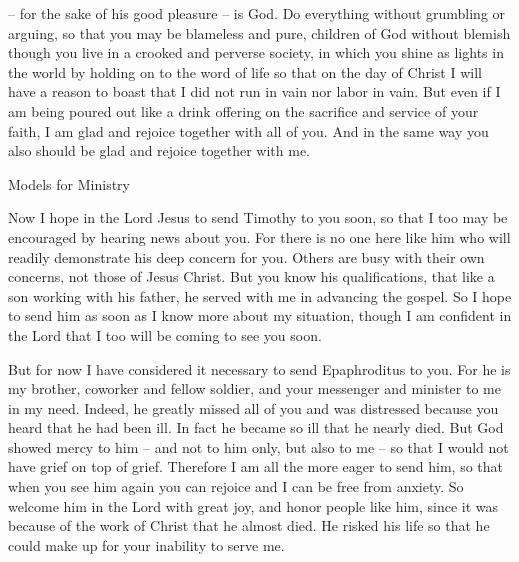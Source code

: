{– for the sake of
his good pleasure
– is
God.
Do
everything
without
grumbling
or
arguing,
so that
you may be
blameless
and
pure,
children
of God
without blemish
though you live in
a crooked
and
perverse
society,
in
which
you shine
as
lights
in
the world
by holding on to
the word
of life
so that
on
the day
of Christ
I
will have a reason to boast
that
I did
not
run
in
vain
nor
labor
in
vain.
But
even if
I am being poured out like a drink offering
on
the sacrifice
and
service
of your
faith,
I am glad
and
rejoice together
with all
of you.
And
in the same way
you
also
should be glad
and
rejoice together
with me.
\par }{\SH Models for Ministry
\par }{\PP {}Now I hope
in
the Lord
Jesus
to send
Timothy
to you
soon,
so that
I too
may be encouraged
by hearing news
about
you.
For
there is no one
here like
him who
will readily
demonstrate
his deep concern
for
you.
Others
are busy with their own
concerns,
not
those of Jesus
Christ.
But
you know
his
qualifications,
that
like
a son
working with his father,
he served
with
me
in advancing
the gospel.
So
I hope
to send
him as soon as
I know
more about
my situation,
though
I am confident
in
the Lord
that
I
too
will be coming
to see you soon.
\par }{\PP {}But
for now I have considered
it necessary
to send
Epaphroditus
to
you.
For he is my brother,
coworker
and
fellow soldier,
and your
messenger
and
minister
to me
in my
need.
Indeed,
he
greatly missed
all
of you
and
was distressed
because
you heard
that
he had been ill.
In fact he became so ill
that he nearly
died.
But
God
showed mercy
to him
– and
not
to him
only,
but
also
to me
– so that
I would
not
have
grief
on
top of grief.
Therefore
I am all the more eager
to send
him,
so that
when
you see
him
again
you can rejoice
and I
can be
free from anxiety.
So
welcome
him
in
the Lord
with
great
joy,
and
honor
people like him,
since
it was because
of the work
of Christ
that he almost
died.
He risked
his life
so
that he could make up
for your
inability
to
serve
me.

}
